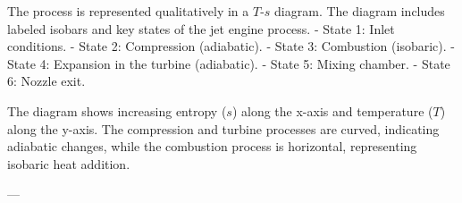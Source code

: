 The process is represented qualitatively in a \( T \)-\( s \) diagram. The diagram includes labeled isobars and key states of the jet engine process.  
- State 1: Inlet conditions.  
- State 2: Compression (adiabatic).  
- State 3: Combustion (isobaric).  
- State 4: Expansion in the turbine (adiabatic).  
- State 5: Mixing chamber.  
- State 6: Nozzle exit.  

The diagram shows increasing entropy (\( s \)) along the x-axis and temperature (\( T \)) along the y-axis. The compression and turbine processes are curved, indicating adiabatic changes, while the combustion process is horizontal, representing isobaric heat addition.  

---